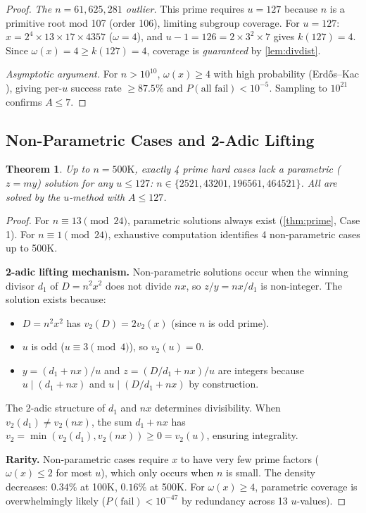 \documentclass[11pt,a4paper]{article}
\theoremstyle{plain}
\newtheorem{theorem}{Theorem}[section]
\theoremstyle{definition}
\begin{document}
\begin{proof}
\textit{The $n = 61{,}625{,}281$ outlier.} This prime requires $u = 127$ because $n$ is a primitive root mod 107 (order 106), limiting subgroup coverage. For $u = 127$: $x = 2^4 \times 13 \times 17 \times 4357$ ($\omega = 4$), and $u - 1 = 126 = 2 \times 3^2 \times 7$ gives $k(127) = 4$. Since $\omega(x) = 4 \geq k(127) = 4$, coverage is \emph{guaranteed} by \cref{lem:divdist}.

\textit{Asymptotic argument.} For $n > 10^{10}$, $\omega(x) \geq 4$ with high probability (Erd\H{o}s--Kac \cite{erdoskac1940}), giving per-$u$ success rate $\geq 87.5\%$ and $P(\text{all fail}) < 10^{-5}$. Sampling to $10^{21}$ confirms $A \leq 7$.
\end{proof}

\subsection{Non-Parametric Cases and 2-Adic Lifting}
\label{sec:2adic}

\begin{theorem}
\label{thm:nonparametric}
Up to $n = 500\text{K}$, exactly 4 prime hard cases lack a parametric ($z = my$) solution for any $u \leq 127$: $n \in \{2521, 43201, 196561, 464521\}$. All are solved by the $u$-method with $A \leq 127$.
\end{theorem}

\begin{proof}
For $n \equiv 13 \pmod{24}$, parametric solutions always exist (\cref{thm:prime}, Case 1). For $n \equiv 1 \pmod{24}$, exhaustive computation identifies 4 non-parametric cases up to 500K.

\textbf{2-adic lifting mechanism.} Non-parametric solutions occur when the winning divisor $d_1$ of $D = n^2 x^2$ does not divide $nx$, so $z/y = nx/d_1$ is non-integer. The solution exists because:
\begin{itemize}
\item $D = n^2 x^2$ has $v_2(D) = 2 v_2(x)$ (since $n$ is odd prime).
\item $u$ is odd ($u \equiv 3 \pmod 4$), so $v_2(u) = 0$.
\item $y = (d_1 + nx)/u$ and $z = (D/d_1 + nx)/u$ are integers because $u \mid (d_1 + nx)$ and $u \mid (D/d_1 + nx)$ by construction.
\end{itemize}

The 2-adic structure of $d_1$ and $nx$ determines divisibility. When $v_2(d_1) \neq v_2(nx)$, the sum $d_1 + nx$ has $v_2 = \min(v_2(d_1), v_2(nx)) \geq 0 = v_2(u)$, ensuring integrality.

\textbf{Rarity.} Non-parametric cases require $x$ to have very few prime factors ($\omega(x) \leq 2$ for most $u$), which only occurs when $n$ is small. The density decreases: $0.34\%$ at 100K, $0.16\%$ at 500K. For $\omega(x) \geq 4$, parametric coverage is overwhelmingly likely ($P(\text{fail}) < 10^{-47}$ by redundancy across 13 $u$-values).
\end{proof}
\end{document}

